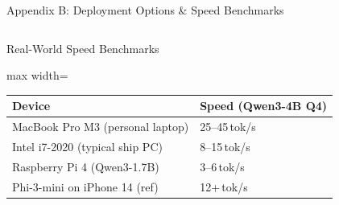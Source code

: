 \documentclass[aspectratio=169,11pt]{beamer}
\begin{document}
\begin{frame}[shrink=15]{Appendix B: Deployment Options \& Speed Benchmarks}
\begin{columns}[T]
\vspace{4pt}
\begin{block}{Real-World Speed Benchmarks}
  \scriptsize
  \begin{adjustbox}{max width=\linewidth}
  \begin{tabular}{@{}ll@{}}
    \toprule
    \textbf{Device} & \textbf{Speed (Qwen3-4B Q4)}\\
    \midrule
    MacBook Pro M3 (personal laptop) & 25--45\,tok/s\\
    Intel i7-2020 (typical ship PC) & 8--15\,tok/s\\
    Raspberry Pi 4 (Qwen3-1.7B) & 3--6\,tok/s\\
    Phi-3-mini on iPhone 14 (ref) & 12+\,tok/s\\
    \bottomrule
  \end{tabular}
  \end{adjustbox}
\end{block}

\end{columns}
\end{frame}
\end{document}
